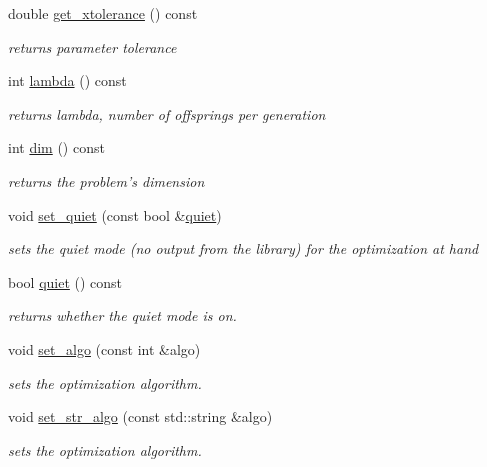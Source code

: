 \begin{DoxyCompactItemize}
double \hyperlink{classlibcmaes_1_1Parameters_a75b95a875008a0216038d43369cd9171}{get\-\_\-xtolerance} () const 
\begin{DoxyCompactList}\small\item\em returns parameter tolerance \end{DoxyCompactList}\item 
int \hyperlink{classlibcmaes_1_1Parameters_a3d569987e9a5eb61bc781ee75b2ab18a}{lambda} () const 
\begin{DoxyCompactList}\small\item\em returns lambda, number of offsprings per generation \end{DoxyCompactList}\item 
int \hyperlink{classlibcmaes_1_1Parameters_a95a3c04400a77d134bb1e9705189a24e}{dim} () const 
\begin{DoxyCompactList}\small\item\em returns the problem's dimension \end{DoxyCompactList}\item 
void \hyperlink{classlibcmaes_1_1Parameters_ae93cf5c15dbe42b19339b26b1c57f872}{set\-\_\-quiet} (const bool \&\hyperlink{classlibcmaes_1_1Parameters_a8562a739088f9f9f466b8d658084c9f7}{quiet})
\begin{DoxyCompactList}\small\item\em sets the quiet mode (no output from the library) for the optimization at hand \end{DoxyCompactList}\item 
bool \hyperlink{classlibcmaes_1_1Parameters_a8562a739088f9f9f466b8d658084c9f7}{quiet} () const 
\begin{DoxyCompactList}\small\item\em returns whether the quiet mode is on. \end{DoxyCompactList}\item 
void \hyperlink{classlibcmaes_1_1Parameters_aeb869d18fa0c987f56216d9bfa1f1a0d}{set\-\_\-algo} (const int \&algo)
\begin{DoxyCompactList}\small\item\em sets the optimization algorithm. \end{DoxyCompactList}\item 
void \hyperlink{classlibcmaes_1_1Parameters_a3d8d58e5d69795804a1a22768c78134d}{set\-\_\-str\-\_\-algo} (const std\-::string \&algo)
\begin{DoxyCompactList}\small\item\em sets the optimization algorithm. \end{DoxyCompactList}\item 

\end{DoxyCompactItemize}
